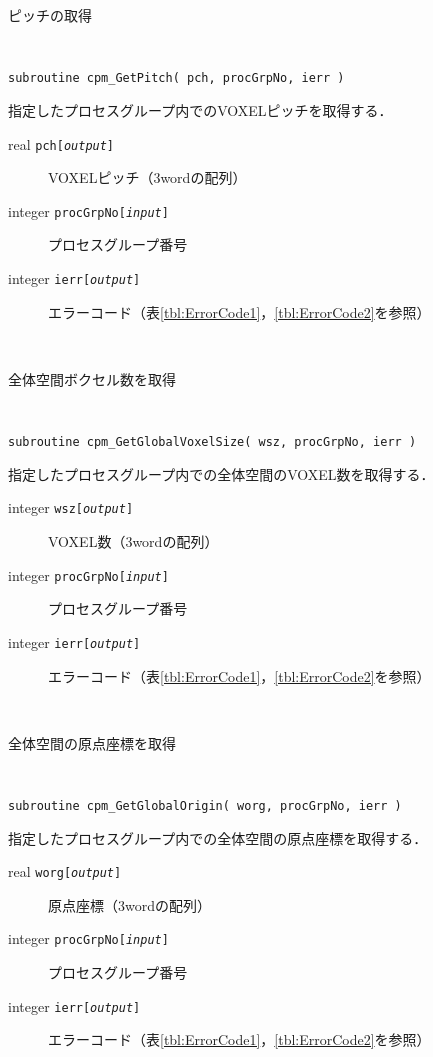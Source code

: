 \begin{spacing}{0.8}
\begin{itembox}[l]{ピッチの取得}
{\tt
\begin{verbatim}
subroutine cpm_GetPitch( pch, procGrpNo, ierr )
\end{verbatim}
}
指定したプロセスグループ内でのVOXELピッチを取得する．
\begin{description}
\item[real    {\tt pch[{\it output}]}] VOXELピッチ（3wordの配列）
\item[integer {\tt procGrpNo[{\it input}]}] プロセスグループ番号
\item[integer {\tt ierr[{\it output}]}] エラーコード（表\ref{tbl:ErrorCode1}，\ref{tbl:ErrorCode2}を参照）
\end{description}
\end{itembox}\\
\end{spacing}

\begin{spacing}{0.8}
\begin{itembox}[l]{全体空間ボクセル数を取得}
{\tt
\begin{verbatim}
subroutine cpm_GetGlobalVoxelSize( wsz, procGrpNo, ierr )
\end{verbatim}
}
指定したプロセスグループ内での全体空間のVOXEL数を取得する．
\begin{description}
\item[integer {\tt wsz[{\it output}]}] VOXEL数（3wordの配列）
\item[integer {\tt procGrpNo[{\it input}]}] プロセスグループ番号
\item[integer {\tt ierr[{\it output}]}] エラーコード（表\ref{tbl:ErrorCode1}，\ref{tbl:ErrorCode2}を参照）
\end{description}
\end{itembox}\\
\end{spacing}

\begin{spacing}{0.8}
\begin{itembox}[l]{全体空間の原点座標を取得}
{\tt
\begin{verbatim}
subroutine cpm_GetGlobalOrigin( worg, procGrpNo, ierr )
\end{verbatim}
}
指定したプロセスグループ内での全体空間の原点座標を取得する．
\begin{description}
\item[real    {\tt worg[{\it output}]}] 原点座標（3wordの配列）
\item[integer {\tt procGrpNo[{\it input}]}] プロセスグループ番号
\item[integer {\tt ierr[{\it output}]}] エラーコード（表\ref{tbl:ErrorCode1}，\ref{tbl:ErrorCode2}を参照）
\end{description}
\end{itembox}\\
\end{spacing}

